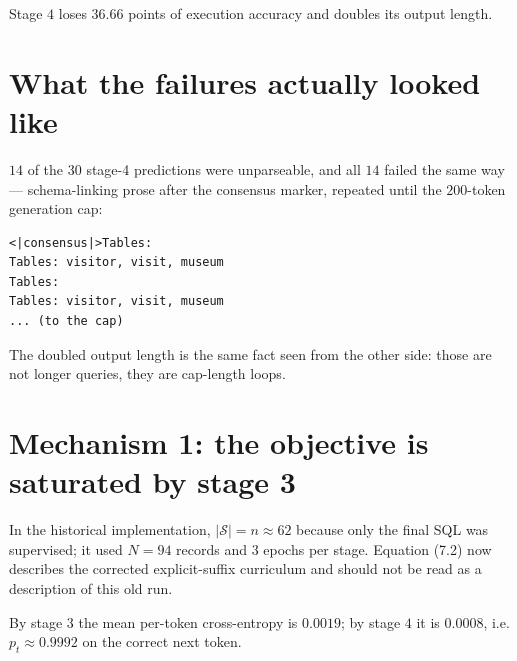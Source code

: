 \documentclass[11pt]{article}
\theoremstyle{definition}
\begin{document}
Stage $4$ loses $36.66$ points of execution accuracy and doubles its output length.

\begin{center}
\end{center}

\section{What the failures actually looked like}

$14$ of the $30$ stage-4 predictions were unparseable, and all $14$ failed the same way --- schema-linking prose after the consensus marker, repeated until the $200$-token generation cap:

\begin{lstlisting}
<|consensus|>Tables:
Tables: visitor, visit, museum
Tables:
Tables: visitor, visit, museum
... (to the cap)
\end{lstlisting}

The doubled output length is the same fact seen from the other side: those are not longer queries, they are cap-length loops.

\begin{center}
\end{center}

\section{Mechanism 1: the objective is saturated by stage 3}

In the historical implementation, $|\mathcal{S}|=n\approx62$ because only the final SQL was supervised; it used $N=94$ records and $3$ epochs per stage. Equation (7.2) now describes the corrected explicit-suffix curriculum and should not be read as a description of this old run.

By stage $3$ the mean per-token cross-entropy is $0.0019$; by stage $4$ it is $0.0008$, i.e. $p_t \approx 0.9992$ on the correct next token.
\end{document}

